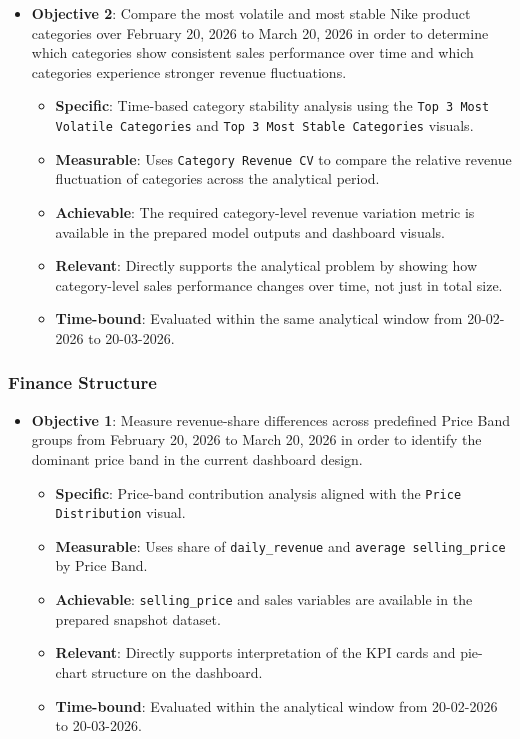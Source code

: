     \begin{itemize}
        \item \textbf{Objective 2}: Compare the most volatile and most stable Nike product categories over February 20, 2026 to March 20, 2026 in order to determine which categories show consistent sales performance over time and which categories experience stronger revenue fluctuations.
        \begin{itemize}
            \item \textbf{Specific}: Time-based category stability analysis using the \texttt{Top 3 Most Volatile Categories} and \texttt{Top 3 Most Stable Categories} visuals.
            \item \textbf{Measurable}: Uses \texttt{Category Revenue CV} to compare the relative revenue fluctuation of categories across the analytical period.
            \item \textbf{Achievable}: The required category-level revenue variation metric is available in the prepared model outputs and dashboard visuals.
            \item \textbf{Relevant}: Directly supports the analytical problem by showing how category-level sales performance changes over time, not just in total size.
            \item \textbf{Time-bound}: Evaluated within the same analytical window from 20-02-2026 to 20-03-2026.
        \end{itemize}
    \end{itemize}

    \subsubsection{Finance Structure}
    \begin{itemize}
        \item \textbf{Objective 1}: Measure revenue-share differences across predefined Price Band groups from February 20, 2026 to March 20, 2026 in order to identify the dominant price band in the current dashboard design.
        \begin{itemize}
            \item \textbf{Specific}: Price-band contribution analysis aligned with the \texttt{Price Distribution} visual.
            \item \textbf{Measurable}: Uses share of \texttt{daily\_revenue} and \texttt{average selling\_price} by Price Band.
            \item \textbf{Achievable}: \texttt{selling\_price} and sales variables are available in the prepared snapshot dataset.
            \item \textbf{Relevant}: Directly supports interpretation of the KPI cards and pie-chart structure on the dashboard.
            \item \textbf{Time-bound}: Evaluated within the analytical window from 20-02-2026 to 20-03-2026.
        \end{itemize}
    \end{itemize}

